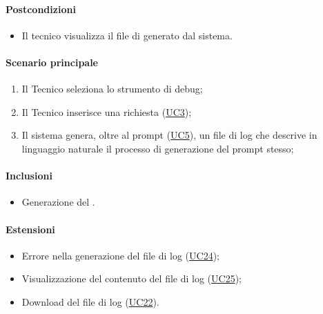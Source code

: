 \paragraph*{Postcondizioni}
\begin{itemize}
  \item Il tecnico visualizza il file di  generato dal sistema.
\end{itemize}

\paragraph*{Scenario principale}
\begin{enumerate}
  \item Il Tecnico seleziona lo strumento di debug;
  \item Il Tecnico inserisce una richiesta (\hyperref[UC3]{UC3});
  \item Il sistema genera, oltre al prompt (\hyperref[UC5]{UC5}), un file di log che descrive in linguaggio naturale il processo di generazione del prompt stesso; 
\end{enumerate}

\paragraph*{Inclusioni}
\begin{itemize}
  \item Generazione del .
\end{itemize}

\paragraph*{Estensioni}
\begin{itemize}
  \item Errore nella generazione del file di log (\hyperref[UC24]{UC24});
  \item Visualizzazione del contenuto del file di log (\hyperref[UC25]{UC25});
  \item Download del file di log (\hyperref[UC22]{UC22}).
\end{itemize}